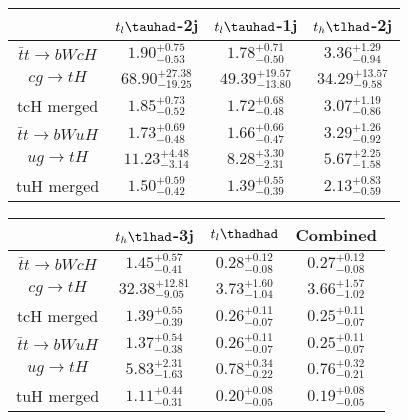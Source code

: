 \centering
\begin{tabular}{|c|c|c|c|} \hline
 & $t_l\tauhad$-2j & $t_l\tauhad$-1j & $t_h\tlhad$-2j\\\hline
$\bar{t}t\to bWcH$ & $1.90^{+0.75}_{-0.53}$ & $1.78^{+0.71}_{-0.50}$ & $3.36^{+1.29}_{-0.94}$\\\hline
$cg\to tH$ & $68.90^{+27.38}_{-19.25}$ & $49.39^{+19.57}_{-13.80}$ & $34.29^{+13.57}_{-9.58}$\\\hline
tcH merged & $1.85^{+0.73}_{-0.52}$ & $1.72^{+0.68}_{-0.48}$ & $3.07^{+1.19}_{-0.86}$\\\hline
$\bar{t}t\to bWuH$ & $1.73^{+0.69}_{-0.48}$ & $1.66^{+0.66}_{-0.47}$ & $3.29^{+1.26}_{-0.92}$\\\hline
$ug\to tH$ & $11.23^{+4.48}_{-3.14}$ & $8.28^{+3.30}_{-2.31}$ & $5.67^{+2.25}_{-1.58}$\\\hline
tuH merged & $1.50^{+0.59}_{-0.42}$ & $1.39^{+0.55}_{-0.39}$ & $2.13^{+0.83}_{-0.59}$\\\hline
\end{tabular}
\begin{tabular}{|c|c|c|c|} \hline
 & $t_h\tlhad$-3j & $t_l\thadhad$ & Combined\\\hline
$\bar{t}t\to bWcH$ & $1.45^{+0.57}_{-0.41}$ & $0.28^{+0.12}_{-0.08}$ & $0.27^{+0.12}_{-0.08}$\\\hline
$cg\to tH$ & $32.38^{+12.81}_{-9.05}$ & $3.73^{+1.60}_{-1.04}$ & $3.66^{+1.57}_{-1.02}$\\\hline
tcH merged & $1.39^{+0.55}_{-0.39}$ & $0.26^{+0.11}_{-0.07}$ & $0.25^{+0.11}_{-0.07}$\\\hline
$\bar{t}t\to bWuH$ & $1.37^{+0.54}_{-0.38}$ & $0.26^{+0.11}_{-0.07}$ & $0.25^{+0.11}_{-0.07}$\\\hline
$ug\to tH$ & $5.83^{+2.31}_{-1.63}$ & $0.78^{+0.34}_{-0.22}$ & $0.76^{+0.32}_{-0.21}$\\\hline
tuH merged & $1.11^{+0.44}_{-0.31}$ & $0.20^{+0.08}_{-0.05}$ & $0.19^{+0.08}_{-0.05}$\\\hline
\end{tabular}
